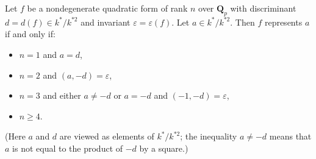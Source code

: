 Let $f$ be a nondegenerate quadratic form of rank $n$ over $\mathbf{Q}_p$ with discriminant $d = d(f) \in k^*/k^{*2}$ and invariant $\varepsilon = \varepsilon(f)$. Let $a \in k^*/k^{*2}$. Then $f$ represents $a$ if and only if:

\begin{itemize}
\item[(i)] $n = 1$ and $a = d$,
\item[(ii)] $n = 2$ and $(a, -d) = \varepsilon$,
\item[(iii)] $n = 3$ and either $a \neq -d$ or $a = -d$ and $(-1, -d) = \varepsilon$,
\item[(iv)] $n \geq 4$.
\end{itemize}
(Here $a$ and $d$ are viewed as elements of $k^*/k^{*2}$; the inequality $a \neq -d$ means that $a$ is not equal to the product of $-d$ by a square.)

